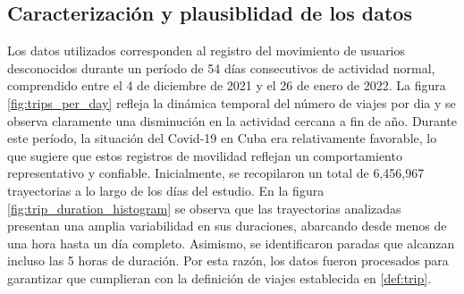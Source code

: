 \subsection{Caracterización y plausiblidad de los datos}
\label{etecsa_data_description}

Los datos utilizados corresponden al registro del movimiento de usuarios desconocidos durante un período de 54 días consecutivos de actividad normal, comprendido entre el 4 de diciembre de 2021 y el 26 de enero de 2022. La figura \ref{fig:trips_per_day} refleja la dinámica temporal del número de viajes por dia y  se observa claramente una disminución en la actividad cercana a fin de año. Durante este período, la situación del Covid-19 en Cuba era relativamente favorable, lo que sugiere que estos registros de movilidad reflejan un comportamiento representativo y confiable. Inicialmente, se recopilaron un total de 6,456,967 trayectorias a lo largo de los días del estudio. En la figura \ref{fig:trip_duration_histogram} se observa que las trayectorias analizadas presentan una amplia variabilidad en sus duraciones, abarcando desde menos de una hora hasta un día completo. Asimismo, se identificaron paradas que alcanzan incluso las 5 horas de duración. Por esta razón, los datos fueron procesados para garantizar que cumplieran con la definición de viajes establecida en \ref{def:trip}.

